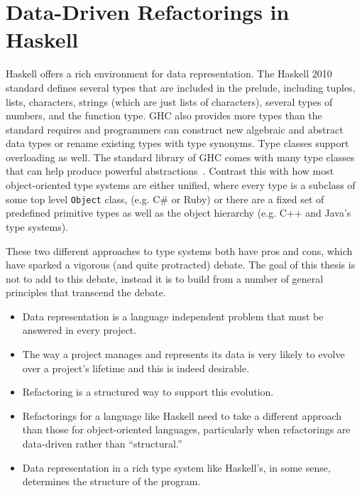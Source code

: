 \section{Data-Driven Refactorings in Haskell}

Haskell offers a rich environment for data representation. The Haskell 2010 standard defines several types that are included in the prelude, including tuples, lists, characters, strings (which are just lists of characters), several types of numbers, and the function type. GHC also provides more types than the standard requires and programmers can construct new algebraic and abstract data types or rename existing types with type synonyms. Type classes support overloading as well. The standard library of GHC comes with many type classes that can help produce powerful abstractions~\citep{typeclassopedia}. Contrast this with how most object-oriented type systems are either unified, where every type is a subclass of some top level \texttt{Object} class, (e.g. C\# or Ruby) or there are a fixed set of predefined primitive types as well as the object hierarchy (e.g. C++ and Java's type systems). 

These two different approaches to type systems both have pros and cons, which have sparked a vigorous (and quite protracted) debate. The goal of this thesis is not to add to this debate, instead it is to build from a number of general principles that transcend the debate.

\begin{itemize}
	\item Data representation is a language independent problem that must be answered in every project.
	\item The way a project manages and represents its data is very likely to evolve over a project's lifetime and this is indeed desirable.
	\item Refactoring is a structured way to support this evolution.
		\item Refactorings for a language like Haskell need to take a different approach than those for object-oriented languages, particularly when refactorings are data-driven rather than ``structural.''  
	\item Data representation in a rich type system like Haskell's, in some sense, determines the structure of the program.
\end{itemize} 

